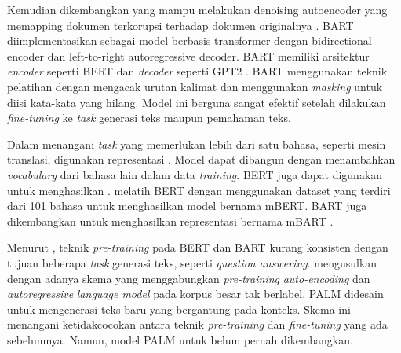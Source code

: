 Kemudian dikembangkan  yang mampu melakukan denoising autoencoder yang memapping dokumen terkorupsi terhadap dokumen originalnya .
\gls{BART} diimplementasikan sebagai model berbasis transformer dengan bidirectional encoder dan left-to-right autoregressive decoder.
\gls{BART} memiliki arsitektur \textit{encoder} seperti \gls{BERT}  dan \textit{decoder} seperti \gls{GPT2} .
\gls{BART} menggunakan teknik pelatihan dengan mengacak urutan kalimat dan menggunakan \textit{masking} untuk diisi kata-kata yang hilang.
Model ini berguna sangat efektif setelah dilakukan \textit{fine-tuning} ke \textit{task} generasi teks maupun pemahaman teks.


Dalam menangani \textit{task} yang memerlukan lebih dari satu bahasa, seperti mesin translasi, digunakan representasi \mwordem{}.
Model \multil{} dapat dibangun dengan menambahkan \textit{vocabulary} dari bahasa lain dalam data \textit{training}.
\gls{BERT} juga dapat digunakan untuk menghasilkan \mwordem{}.
\textcite{devlin2019} melatih \gls{BERT} dengan menggunakan dataset yang terdiri dari 101 bahasa untuk menghasilkan \multil{} model bernama mBERT.
\gls{BART} juga dikembangkan untuk menghasilkan representasi \mwordem{} bernama mBART .

Menurut \textcite{bi2020}, teknik \textit{pre-training} pada \gls{BERT} dan \gls{BART} kurang konsisten dengan tujuan beberapa \textit{task} generasi teks, seperti \textit{question answering}.
\textcite{bi2020} mengusulkan  dengan adanya skema yang menggabungkan \textit{pre-training} \textit{auto-encoding} dan \textit{autoregressive} \textit{language model} pada korpus besar tak berlabel.
\gls{PALM} didesain untuk mengenerasi teks baru yang bergantung pada konteks.
Skema ini menangani ketidakcocokan antara teknik \textit{pre-training} dan \textit{fine-tuning} yang ada sebelumnya.
Namun, model \gls{PALM} untuk \mwordem belum pernah dikembangkan.
